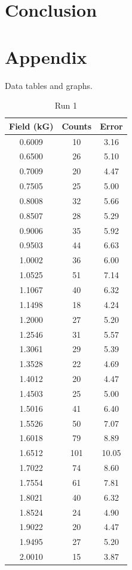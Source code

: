 \section{Conclusion}
\section{Appendix}
Data tables and graphs.
\begin{table}[h!]
\caption{Run 1}
\begin{tabular}{|c|c|c|} \hline
Field	(kG)&	Counts	&	Error	\\	\hline
0.6009	&	10	&	3.16	\\	\hline
0.6500	&	26	&	5.10	\\	\hline
0.7009	&	20	&	4.47	\\	\hline
0.7505	&	25	&	5.00	\\	\hline
0.8008	&	32	&	5.66	\\	\hline
0.8507	&	28	&	5.29	\\	\hline
0.9006	&	35	&	5.92	\\	\hline
0.9503	&	44	&	6.63	\\	\hline
1.0002	&	36	&	6.00	\\	\hline
1.0525	&	51	&	7.14	\\	\hline
1.1067	&	40	&	6.32	\\	\hline
1.1498	&	18	&	4.24	\\	\hline
1.2000	&	27	&	5.20	\\	\hline
1.2546	&	31	&	5.57	\\	\hline
1.3061	&	29	&	5.39	\\	\hline
1.3528	&	22	&	4.69	\\	\hline
1.4012	&	20	&	4.47	\\	\hline
1.4503	&	25	&	5.00	\\	\hline
1.5016	&	41	&	6.40	\\	\hline
1.5526	&	50	&	7.07	\\	\hline
1.6018	&	79	&	8.89	\\	\hline
1.6512	&	101	&	10.05	\\	\hline
1.7022	&	74	&	8.60	\\	\hline
1.7554	&	61	&	7.81	\\	\hline
1.8021	&	40	&	6.32	\\	\hline
1.8524	&	24	&	4.90	\\	\hline
1.9022	&	20	&	4.47	\\	\hline
1.9495	&	27	&	5.20	\\	\hline
2.0010	&	15	&	3.87	\\	\hline
\end{tabular}
\end{table}
